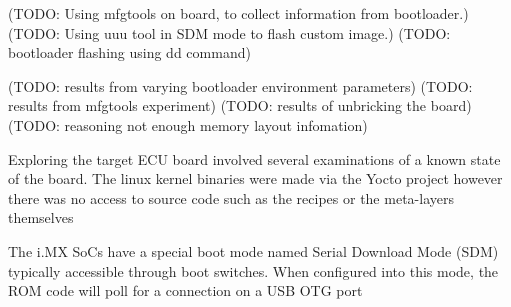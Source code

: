 (TODO: Using mfgtools on board, to collect information from bootloader.)
(TODO: Using uuu tool in SDM mode to flash custom image.)
(TODO: bootloader flashing using dd command)

(TODO: results from varying bootloader environment parameters)
(TODO: results from mfgtools experiment)
(TODO: results of unbricking the board)
(TODO: reasoning not enough memory layout infomation)


Exploring the target ECU board involved several examinations of a known state of the board. The linux kernel binaries were made via the Yocto project however there was no access to source code such as the recipes or the meta-layers themselves

The i.MX SoCs have a special boot mode named Serial Download Mode (SDM) typically accessible through boot switches. When configured into this mode, the ROM code will poll for a connection on a USB OTG port
